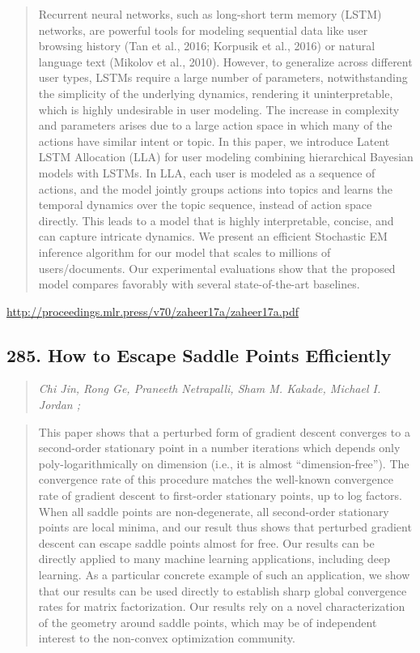 \documentclass{article}
\begin{document}
\begin{quote}
    Recurrent neural networks, such as long-short term memory (LSTM) networks, are powerful tools for modeling sequential data like user browsing history (Tan et al., 2016; Korpusik et al., 2016) or natural language text (Mikolov et al., 2010). However, to generalize across different user types, LSTMs require a large number of parameters, notwithstanding the simplicity of the underlying dynamics, rendering it uninterpretable, which is highly undesirable in user modeling. The increase in complexity and parameters arises due to a large action space in which many of the actions have similar intent or topic. In this paper, we introduce Latent LSTM Allocation (LLA) for user modeling combining hierarchical Bayesian models with LSTMs. In LLA, each user is modeled as a sequence of actions, and the model jointly groups actions into topics and learns the temporal dynamics over the topic sequence, instead of action space directly. This leads to a model that is highly interpretable, concise, and can capture intricate dynamics. We present an efficient Stochastic EM inference algorithm for our model that scales to millions of users/documents. Our experimental evaluations show that the proposed model compares favorably with several state-of-the-art baselines.  
\end{quote}

\href{http://proceedings.mlr.press/v70/zaheer17a/zaheer17a.pdf}{http://proceedings.mlr.press/v70/zaheer17a/zaheer17a.pdf}

\subsection{285. How to Escape Saddle Points Efficiently}

\begin{quote}
\footnotesize{\textit{Chi Jin, Rong Ge, Praneeth Netrapalli, Sham M. Kakade, Michael I. Jordan ;}}

\end{quote}

\begin{quote}
    This paper shows that a perturbed form of gradient descent converges to a second-order stationary point in a number iterations which depends only poly-logarithmically on dimension (i.e., it is almost “dimension-free”). The convergence rate of this procedure matches the well-known convergence rate of gradient descent to first-order stationary points, up to log factors. When all saddle points are non-degenerate, all second-order stationary points are local minima, and our result thus shows that perturbed gradient descent can escape saddle points almost for free. Our results can be directly applied to many machine learning applications, including deep learning. As a particular concrete example of such an application, we show that our results can be used directly to establish sharp global convergence rates for matrix factorization. Our results rely on a novel characterization of the geometry around saddle points, which may be of independent interest to the non-convex optimization community.  
\end{quote}
\end{document}
